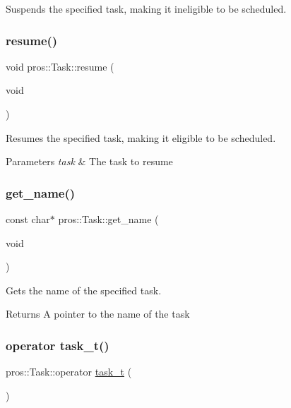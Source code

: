 Suspends the specified task, making it ineligible to be scheduled. 

\mbox{\label{classpros_1_1Task_ada2c08d04b39f11582cea90b59b8f317}} 
\subsubsection{\texorpdfstring{resume()}{resume()}}
{\footnotesize\ttfamily void pros\+::\+Task\+::resume (\begin{DoxyParamCaption}\item[{void}]{ }\end{DoxyParamCaption})}



Resumes the specified task, making it eligible to be scheduled. 


\begin{DoxyParams}{Parameters}
{\em task} & The task to resume \\
\hline
\end{DoxyParams}
\mbox{\label{classpros_1_1Task_a3c559d11cf602b99fc870b8be43fe191}} 
\subsubsection{\texorpdfstring{get\+\_\+name()}{get\_name()}}
{\footnotesize\ttfamily const char$\ast$ pros\+::\+Task\+::get\+\_\+name (\begin{DoxyParamCaption}\item[{void}]{ }\end{DoxyParamCaption})}



Gets the name of the specified task. 

\begin{DoxyReturn}{Returns}
A pointer to the name of the task 
\end{DoxyReturn}
\mbox{\label{classpros_1_1Task_a16c15efcec74a76b6848fc999ff0c232}} 
\subsubsection{\texorpdfstring{operator task\+\_\+t()}{operator task\_t()}}
{\footnotesize\ttfamily pros\+::\+Task\+::operator \hyperlink{rtos_8h_a1d7e0825b8d8876e8cd8ece3f9115293}{task\+\_\+t} (\begin{DoxyParamCaption}{ }\end{DoxyParamCaption})\hspace{0.3cm}{\ttfamily [inline]}}



